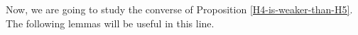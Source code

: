 \documentclass[preprint,12pt]{elsarticle}
\renewcommand{\epsilon}{\varepsilon}
\newcommand{\N}{\mathbb{N}}
\newcommand{\inte}{{\operatorname{int \  }}}
\newcommand{\bd}{{\operatorname{bd \ }}}
\theoremstyle{plain}
\theoremstyle{definition}
\theoremstyle{remark}
\begin{document}
	
	
	
	
	Now, we are going to study the converse of Proposition \ref{H4-is-weaker-than-H5}.  The following lemmas will be useful in this line.
\end{document}
